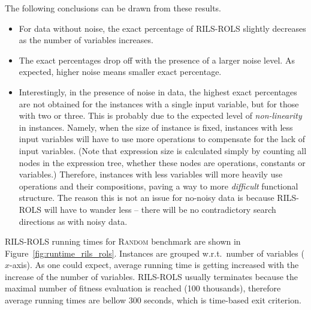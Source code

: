 \documentclass{bmcart}
\begin{document}
The following conclusions can be drawn from these results.

\begin{itemize}
	\item For data without noise, the exact percentage of \textsc{RILS}-\textsc{ROLS} slightly decreases as the  number of variables increases. 
	\item The exact percentages drop off with the presence of a larger noise level. As expected, higher noise means smaller exact percentage.
	\item Interestingly, in the presence of noise in data, the highest exact percentages are not obtained for the instances with a single input variable, but for those with two or three. This is probably due to the expected level of \emph{non-linearity} in instances. Namely, when the size of instance is fixed, instances with less input variables will have to use more operations to compensate for the lack of input variables. (Note that expression size is calculated simply by counting all nodes in the expression tree, whether these nodes are operations, constants or variables.) Therefore, instances with less variables will more heavily use operations and their compositions, paving a way to more \emph{difficult} functional structure. 
	The reason this is not an issue for no-noisy data is because \textsc{RILS-ROLS} will have to wander less -- there will be no contradictory search directions as with noisy data.
\end{itemize}

\textsc{RILS}-\textsc{ROLS} running times for \textsc{Random} benchmark are shown in Figure~\ref{fig:runtime_rils_rols}. Instances are grouped w.r.t.\ number of variables ($x$-axis). 
As one could expect, average running time is getting increased with the increase of the number of variables. 
\textsc{RILS-ROLS} usually terminates because the maximal number of fitness evaluation is reached (100 thousands), therefore average running times are bellow 300 seconds, which is time-based exit criterion.
\end{document}
